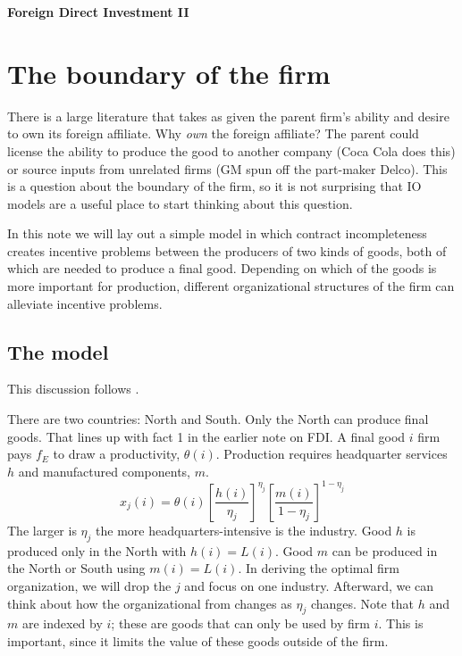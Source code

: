 \documentclass[11pt, pdftex]{article}
\newcommand{\ph}{\phantom}
\begin{document}
\ph{whatever}
\medskip

\centerline{\Large \bf Foreign Direct Investment II}
\section{The boundary of the firm}
There is a large literature that takes as given the parent firm's ability and desire to own its foreign affiliate. Why \textit{own} the foreign affiliate? The parent could license the ability to produce the good to another company (Coca Cola does this) or source inputs from unrelated firms (GM spun off the part-maker Delco). This is a question about the boundary of the firm, so it is not surprising that IO models are a useful place to start thinking about this question.

In this note we will lay out a simple model in which contract incompleteness creates incentive problems between the producers of two kinds of goods, both of which are needed to produce a final good. Depending on which of the goods is more important for production, different organizational structures of the firm can alleviate incentive problems.
\subsection{The model}
This discussion follows \citet{antrashelpman}.

 There are two countries: North and South. Only the North can produce final goods. That lines up with fact 1 in the earlier note on FDI. A final good $i$ firm pays $f_E$ to draw a productivity, $\theta(i)$. Production requires headquarter services $h$ and manufactured components, $m$.
\begin{equation}\label{eq:prod}
    x_j(i)=\theta(i)\left[\frac{h(i)}{\eta_j}\right]^{\eta_j}\left[\frac{m(i)}{1-\eta_j}\right]^{1-\eta_j}
\end{equation}
The larger is $\eta_j$ the more headquarters-intensive is the industry. Good $h$ is produced only in the North with $h(i)=L(i)$. Good $m$ can be produced in the North or South using $m(i)=L(i)$.  In deriving the optimal firm organization, we will drop the $j$ and focus on one industry. Afterward, we can think about how the organizational from changes as $\eta_j$ changes. Note that $h$ and $m$ are indexed by $i$; these are goods that can only be used by firm $i$. This is important, since it limits the value of these goods outside of the firm.
\end{document}
